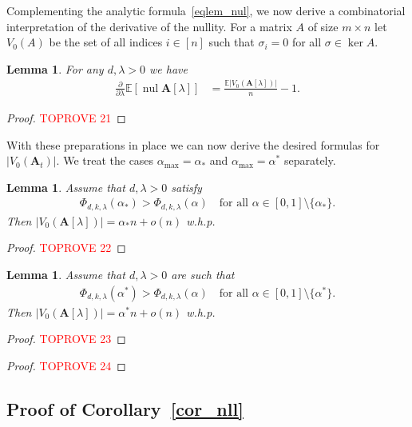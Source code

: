\documentclass[10pt,reqno]{amsart}
\numberwithin{equation}{section}
\renewcommand{\vec}[1]{\boldsymbol{#1}}
\newcommand{\amax}{\alpha_{\max}}
\newcommand{\frz}{V_0}
\newcommand\vA{\vec A}
\newcommand\Erw{\mathbb{E}}
\newcommand\ex{\Erw}
\newcommand{\whp}{w.h.p.}
\newcommand\Cor{Corollary}
\newtheorem{lemma}[definition]{Lemma}
\DeclareMathOperator{\nul}{nul}
\begin{document}
Complementing the analytic formula~\eqref{eqlem_nul}, we now derive a combinatorial interpretation of the derivative of the nullity.
For a matrix $A$ of size $m\times n$ let $\frz(A)$ be the set of all indices $i\in[n]$ such that $\sigma_i=0$ for all $\sigma\in\ker A$.

\begin{lemma}\label{lem_diff_nul}
	For any $d,\lambda>0$ we have
	\begin{align*}
		\frac\partial{\partial\lambda}\ex[\nul \vA[\lambda]]&=\frac{\ex|\frz(\vA[\lambda])|}n-1.
	\end{align*}
\end{lemma}
\begin{proof}\textcolor{red}{TOPROVE 21}\end{proof}

With these preparations in place we can now derive the desired formulas for $|V_0(\vA_t)|$.
We treat the cases $\amax=\alpha_*$ and $\amax=\alpha^*$ separately.

\begin{lemma}\label{lem_nul_*}
	Assume that $d,\lambda>0$ satisfy
	\begin{align}\label{eq_cor_frz_*}
		\Phi_{d,k,\lambda}(\alpha_*)>\Phi_{d,k,\lambda}(\alpha)\quad\mbox{for all $\alpha\in[0,1]\setminus\{\alpha_*\}$.}
	\end{align}
	Then $|\frz(\vA[\lambda])|=\alpha_*n+o(n)$ \whp
\end{lemma}
\begin{proof}\textcolor{red}{TOPROVE 22}\end{proof}

\begin{lemma}\label{lem_nul^*}
	Assume that $d,\lambda>0$ are such that
	\begin{align}\label{eq_cor_frz^*}
		\Phi_{d,k,\lambda}(\alpha^*)>\Phi_{d,k,\lambda}(\alpha)\quad\mbox{for all $\alpha\in[0,1]\setminus\{\alpha^*\}$.}
	\end{align}
	Then $|\frz(\vA[\lambda])|=\alpha^*n+o(n)$ \whp
\end{lemma}
\begin{proof}\textcolor{red}{TOPROVE 23}\end{proof}

\begin{proof}\textcolor{red}{TOPROVE 24}\end{proof}



\subsection{Proof of \Cor~\ref{cor_nll}}\label{sec_cor_nll}
\end{document}
